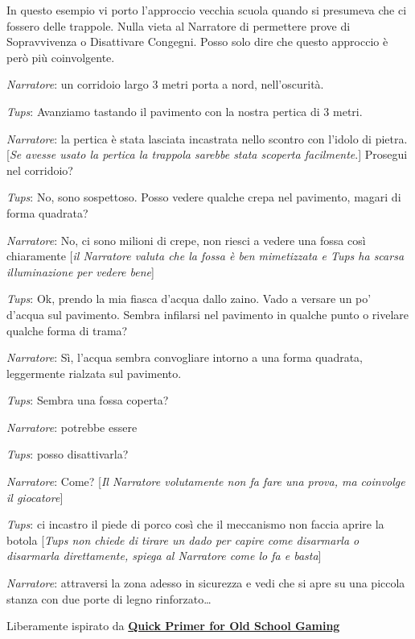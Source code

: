 \begin{narratore}
In questo esempio vi porto l'approccio vecchia scuola quando si presumeva che ci fossero delle trappole. Nulla vieta al Narratore di permettere prove di Sopravvivenza o Disattivare Congegni. Posso solo dire che questo approccio è però più coinvolgente.

\bigskip

\emph{Narratore}: un corridoio largo 3 metri porta a nord, nell'oscurità.

\emph{Tups}: Avanziamo tastando il pavimento con la nostra pertica di 3 metri.

\emph{Narratore}: la pertica è stata lasciata incastrata nello scontro con l'idolo di pietra.
[\emph{Se avesse usato la pertica la trappola sarebbe stata scoperta facilmente}.]
Prosegui nel corridoio?

\emph{Tups}: No, sono sospettoso. Posso vedere qualche crepa nel pavimento, magari di forma quadrata?

\emph{Narratore}: No, ci sono milioni di crepe, non riesci a vedere una fossa così chiaramente [\emph{il Narratore valuta che la fossa è ben mimetizzata e Tups ha scarsa illuminazione per vedere bene}]

\emph{Tups}: Ok, prendo la mia fiasca d'acqua dallo zaino. Vado a versare un po' d'acqua sul pavimento. Sembra infilarsi nel pavimento in qualche punto o rivelare qualche forma di trama?

\emph{Narratore}: Sì, l'acqua sembra convogliare intorno a una forma quadrata, leggermente rialzata sul pavimento.

\emph{Tups}: Sembra una fossa coperta?

\emph{Narratore}: potrebbe essere

\emph{Tups}: posso disattivarla?

\emph{Narratore}: Come? [\emph{Il Narratore volutamente non fa fare una prova, ma coinvolge il giocatore}]

\emph{Tups}: ci incastro il piede di porco così che il meccanismo non faccia aprire la botola [\emph{Tups non chiede di tirare un dado per capire come disarmarla o disarmarla direttamente, spiega al Narratore come lo fa e basta}]

\emph{Narratore}: attraversi la zona adesso in sicurezza e vedi che si apre su una piccola stanza con due porte di legno rinforzato…

\medskip

Liberamente ispirato da \href{https://friendorfoe.com/d/Old%20School%20Primer.pdf}{ \textbf{Quick Primer for Old School Gaming}}

\end{narratore}

